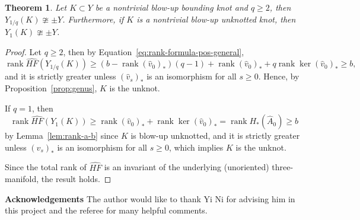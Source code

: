 \documentclass{article}
\newtheorem{theorem}[equation]{Theorem}
\theoremstyle{remark}
\numberwithin{equation}{section}
\numberwithin{table}{section}
\newcommand{\wh}{\widehat}
\DeclareMathOperator{\rank}{rank}
\renewcommand{\(}{\left(}
\renewcommand{\)}{\right)}
\begin{document}
\begin{theorem}
Let $K\subset Y$ be a nontrivial blow-up bounding knot and $q\ge 2$, then $Y_{1/q}(K)\ncong\pm Y$. Furthermore, if $K$ is a nontrivial blow-up unknotted knot, then $Y_1(K)\ncong\pm Y$.
\end{theorem}
\begin{proof}
Let $q\ge 2$, then by Equation~\ref{eq:rank-formula-pos-general},
$$\rank\wh{HF}(Y_{1/q}(K))\ge (b-\rank(\wh v_0)_*)(q-1)+\rank(\wh v_0)_*+q\rank\ker(\wh v_0)_*\ge b,$$ and it is strictly greater unless $(\wh v_s)_*$ is an isomorphism for all $s\ge 0$. Hence, by Proposition~\ref{prop:genus}, $K$ is the unknot.

If $q=1$, then
$$\rank\wh{HF}(Y_1(K))\ge \rank(\wh v_0)_*+\rank\ker(\wh v_0)_*=\rank H_*(\wh A_0)\ge b$$ by Lemma~\ref{lem:rank-a-b} since $K$ is blow-up unknotted, and it is strictly greater unless $(\wh v_s)_*$ is an isomorphism for all $s\ge 0$, which implies $K$ is the unknot.

Since the total rank of $\wh{HF}$ is an invariant of the underlying (unoriented) three-manifold, the result holds.
\end{proof}


































\textbf{Acknowledgements} The author would like to thank Yi Ni for advising him in this project and the referee for many helpful comments.



\end{document}
